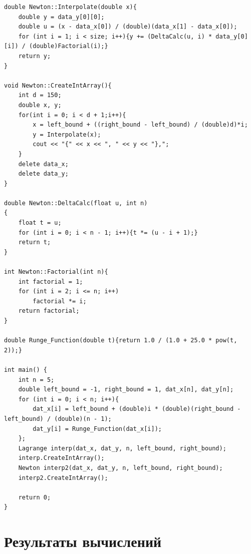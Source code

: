 \documentclass[
11pt,
master, %
subf, %
href, %
colorlinks=true, %
times, %
]{disser}
\begin{document}
{\begin{verbatim}
double Newton::Interpolate(double x){
    double y = data_y[0][0];
    double u = (x - data_x[0]) / (double)(data_x[1] - data_x[0]);
    for (int i = 1; i < size; i++){y += (DeltaCalc(u, i) * data_y[0][i]) / (double)Factorial(i);}
    return y;
}

void Newton::CreateIntArray(){
    int d = 150;
    double x, y;
    for(int i = 0; i < d + 1;i++){
        x = left_bound + ((right_bound - left_bound) / (double)d)*i;
        y = Interpolate(x);
        cout << "{" << x << ", " << y << "},";
    }
    delete data_x;
    delete data_y;
}

double Newton::DeltaCalc(float u, int n)
{
    float t = u;
    for (int i = 0; i < n - 1; i++){t *= (u - i + 1);}
    return t;
}

int Newton::Factorial(int n){
    int factorial = 1;
    for (int i = 2; i <= n; i++)
        factorial *= i;
    return factorial;
}

double Runge_Function(double t){return 1.0 / (1.0 + 25.0 * pow(t, 2));}

int main() {
    int n = 5;
    double left_bound = -1, right_bound = 1, dat_x[n], dat_y[n];
    for (int i = 0; i < n; i++){
        dat_x[i] = left_bound + (double)i * (double)(right_bound - left_bound) / (double)(n - 1);
        dat_y[i] = Runge_Function(dat_x[i]);
    };
    Lagrange interp(dat_x, dat_y, n, left_bound, right_bound);
    interp.CreateIntArray();
    Newton interp2(dat_x, dat_y, n, left_bound, right_bound);
    interp2.CreateIntArray();

    return 0;
}
\end{verbatim}
}

\newpage
\section{Результаты вычислений}
\end{document}
